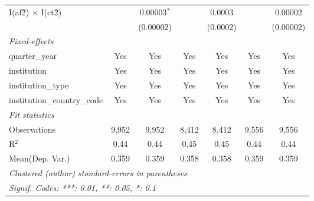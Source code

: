 \begin{tabular}{lcccccc}
   I(af\^2) $\times$ I(ct\^2)         &               & 0.00003$^{*}$  &             & 0.0003         &               & 0.00002\\   
                                      &               & (0.00002)      &             & (0.0002)       &               & (0.00002)\\   
   \midrule
   \emph{Fixed-effects}\\
   quarter\_year                      & Yes           & Yes            & Yes         & Yes            & Yes           & Yes\\  
   institution                        & Yes           & Yes            & Yes         & Yes            & Yes           & Yes\\  
   institution\_type                  & Yes           & Yes            & Yes         & Yes            & Yes           & Yes\\  
   institution\_country\_code         & Yes           & Yes            & Yes         & Yes            & Yes           & Yes\\  
   \midrule
   \emph{Fit statistics}\\
   Observations                       & 9,952         & 9,952          & 8,412       & 8,412          & 9,556         & 9,556\\  
   R$^2$                              & 0.44          & 0.44           & 0.45        & 0.45           & 0.44          & 0.44\\  
Mean(Dep. Var.) & 0.359 & 0.359 & 0.358 & 0.358 & 0.359 & 0.359 \\
   \midrule \midrule
   \multicolumn{7}{l}{\emph{Clustered (author) standard-errors in parentheses}}\\
   \multicolumn{7}{l}{\emph{Signif. Codes: ***: 0.01, **: 0.05, *: 0.1}}\\
\end{tabular}
\par\endgroup
